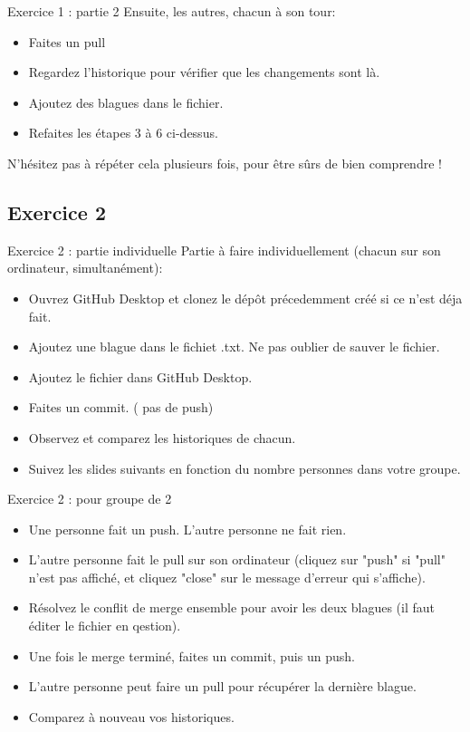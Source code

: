 \documentclass{beamer}
\begin{document}
\begin{frame}{Exercice 1 : partie 2}
    Ensuite, les autres, chacun à son tour:
    \begin{itemize}
        \item Faites un pull
        \item Regardez l'historique pour vérifier que les changements sont là.
        \item Ajoutez des blagues dans le fichier.
        \item Refaites les étapes 3 à 6 ci-dessus.
    \end{itemize}
    N'hésitez pas à répéter cela plusieurs fois, pour être sûrs de bien comprendre !
\end{frame}

\subsection{Exercice 2}
\begin{frame}{Exercice 2 : partie individuelle}
    Partie à faire individuellement (chacun sur son ordinateur, simultanément):
    \begin{itemize}
        \item Ouvrez GitHub Desktop et clonez le dépôt précedemment créé
            si ce n'est déja fait.
        \item Ajoutez une blague dans le fichiet .txt. Ne pas oublier de sauver
            le fichier.
        \item Ajoutez le fichier dans GitHub Desktop.
        \item Faites un commit. ( pas de push)
        \item Observez et comparez les historiques de chacun.
        \item Suivez les slides suivants en fonction du nombre personnes dans
            votre groupe.
    \end{itemize}
\end{frame}

\begin{frame}{Exercice 2 : pour groupe de 2}
    \begin{itemize}
        \item Une personne fait un push. L'autre personne ne fait rien.
        \item L'autre personne fait le pull sur son ordinateur
            (cliquez sur "push" si "pull" n'est pas affiché, et cliquez "close" sur le message d'erreur qui s'affiche).
        \item Résolvez le conflit de merge ensemble pour avoir les deux blagues (il faut éditer le fichier en qestion).
        \item Une fois le merge terminé, faites un commit, puis un push.
        \item L'autre personne peut faire un pull pour récupérer la dernière blague.
        \item Comparez à nouveau vos historiques.
    \end{itemize}
\end{frame}
\end{document}
